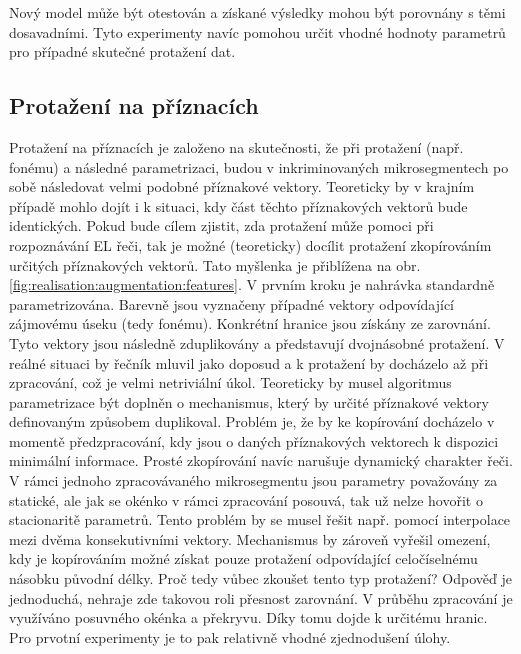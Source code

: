 \noindent Nový model může být otestován a získané výsledky mohou být porovnány s těmi dosavadními.
Tyto experimenty navíc pomohou určit vhodné hodnoty parametrů pro případné skutečné protažení dat.


\subsection{Protažení na příznacích}
\label{chap:realisation:augmentation:features}

Protažení na příznacích je založeno na skutečnosti, že při protažení (např. fonému) a následné parametrizaci, budou v inkriminovaných mikrosegmentech po sobě následovat velmi podobné příznakové vektory.
Teoreticky by v krajním případě mohlo dojít i k situaci, kdy část těchto příznakových vektorů bude identických.
Pokud bude cílem zjistit, zda protažení může pomoci při rozpoznávání EL řeči, tak je možné (teoreticky) docílit protažení zkopírováním určitých příznakových vektorů.
Tato myšlenka je přiblížena na obr. \ref{fig:realisation:augmentation:features}.
V prvním kroku je nahrávka standardně parametrizována.
Barevně jsou vyznačeny případné vektory odpovídající zájmovému úseku (tedy fonému).
Konkrétní hranice jsou získány ze zarovnání.
Tyto vektory jsou následně zduplikovány a představují dvojnásobné protažení.
V reálné situaci by řečník mluvil jako doposud a k protažení by docházelo až při zpracování, což je velmi netriviální úkol.
Teoreticky by musel algoritmus parametrizace být doplněn o mechanismus, který by určité příznakové vektory definovaným způsobem duplikoval.
Problém je, že by ke kopírování docházelo v momentě předzpracování, kdy jsou o daných příznakových vektorech k dispozici minimální informace.
Prosté zkopírování navíc narušuje dynamický charakter řeči.
V rámci jednoho zpracovávaného mikrosegmentu jsou parametry považovány za statické, ale jak se okénko v rámci zpracování posouvá, tak už nelze hovořit o stacionaritě parametrů.
Tento problém by se musel řešit např. pomocí interpolace mezi dvěma konsekutivními vektory.
Mechanismus by zároveň vyřešil omezení, kdy je kopírováním možné získat pouze protažení odpovídající celočíselnému násobku původní délky.
Proč tedy vůbec zkoušet tento typ protažení?
Odpověď je jednoduchá, nehraje zde takovou roli přesnost zarovnání.
V průběhu zpracování je využíváno posuvného okénka a překryvu.
Díky tomu dojde k určitému  hranic.
Pro prvotní experimenty je to pak relativně vhodné zjednodušení úlohy.

